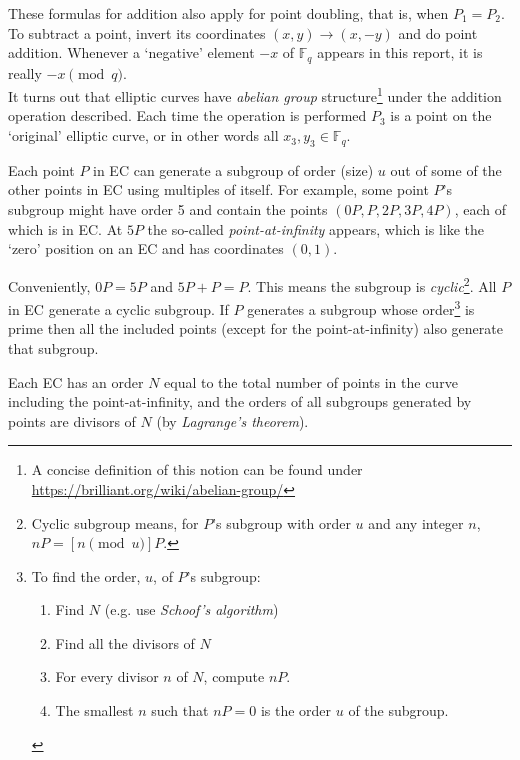 These formulas for addition also apply for point doubling, that is, when  \(P_1 = P_2\). To subtract a point, invert its coordinates $(x,y) \rightarrow (x,-y)$ and do point addition. Whenever a `negative' element $-x$ of $\mathbb{F}_q$ appears in this report, it is really $-x \pmod{q}$.
\\

It turns out that elliptic curves have {\em abelian group} structure\footnote{\label{abelian_note}A concise definition of this notion can be found under \url{https://brilliant.org/wiki/abelian-group/}} under the addition operation described. Each time the operation is performed $P_3$ is a point on the `original' elliptic curve, or in other words all $x_3,y_3 \in \mathbb{F}_q$.

Each point $P$ in EC can generate a subgroup of order (size) $u$ out of some of the other points in EC using multiples of itself. For example, some point $P$’s subgroup might have order 5 and contain the points $(0P, P, 2P, 3P, 4P)$, each of which is in EC. At $5P$ the so-called {\em point-at-infinity} appears, which is like the `zero’ position on an EC and has coordinates $(0, 1)$. 

Conveniently, $0P = 5P$ and $5P + P = P$. This means the subgroup is {\em cyclic}\footnote{\label{cyclical_note}Cyclic subgroup means, for $P$'s subgroup with order $u$ and any integer $n$, $n P = [n \pmod{u}] P$.}. All $P$ in EC generate a cyclic subgroup. If $P$ generates a subgroup whose order\footnote{\label{find_order_note}To find the order, $u$, of $P$'s subgroup:
\begin{enumerate}
    \item Find $N$ (e.g. use {\em Schoof's algorithm}) 
    \item Find all the divisors of $N$
    \item For every divisor $n$ of $N$, compute $n P$.
    \item The smallest $n$ such that $n P = 0$ is the order $u$ of the subgroup.
\end{enumerate}} is prime then all the included points (except for the point-at-infinity) also generate that subgroup.

Each EC has an order $N$ equal to the total number of points in the curve including the point-at-infinity, and the orders of all subgroups generated by points are divisors of $N$ (by {\em Lagrange’s theorem}). 

